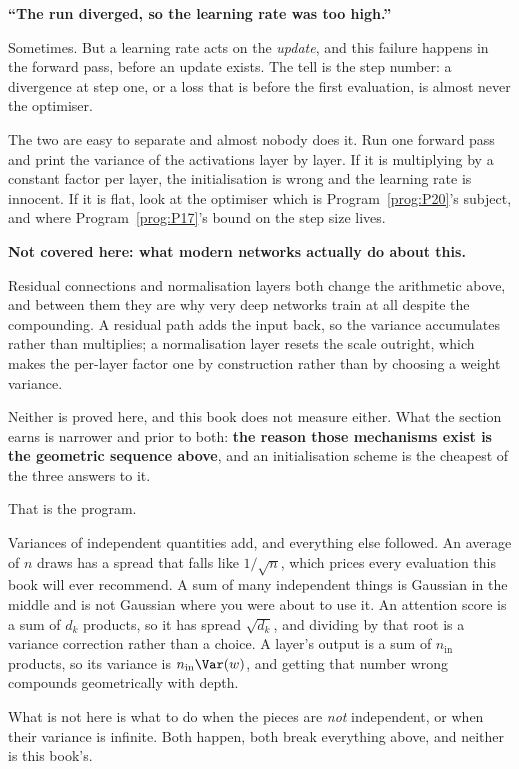 \begin{fr}
\begin{trapbox}
\textbf{\enquote{The run diverged, so the learning rate was too high.}}

Sometimes. But a learning rate acts on the \emph{update}, and this failure
happens in the forward pass, before an update exists. The tell is the step
number: a divergence at step one, or a loss that is  before the
first evaluation, is almost never the optimiser.

The two are easy to separate and almost nobody does it. Run one forward pass
and print the variance of the activations layer by layer. If it is
multiplying by a constant factor per layer, the initialisation is wrong and
the learning rate is innocent. If it is flat, look at the optimiser \dash{}
which is Program~\ref{prog:P20}'s subject, and where
Program~\ref{prog:P17}'s bound on the step size lives.
\end{trapbox}
\end{fr}

\begin{fr}
\begin{rigourbox}
\textbf{Not covered here: what modern networks actually do about this.}

Residual connections and normalisation layers both change the arithmetic
above, and between them they are why very deep networks train at all despite
the compounding. A residual path adds the input back, so the variance
accumulates rather than multiplies; a normalisation layer resets the scale
outright, which makes the per-layer factor one by construction rather than by
choosing a weight variance.

Neither is proved here, and this book does not measure either. What the
section earns is narrower and prior to both: \textbf{the reason those
mechanisms exist is the geometric sequence above}, and an initialisation
scheme is the cheapest of the three answers to it.
\end{rigourbox}
\end{fr}

\begin{fr}
That is the program.

Variances of independent quantities add, and everything else followed. An
average of $n$ draws has a spread that falls like $1/\sqrt{n}$, which prices
every evaluation this book will ever recommend. A sum of many independent
things is Gaussian in the middle and is not Gaussian where you were about to
use it. An attention score is a sum of $d_k$ products, so it has spread
$\sqrt{d_k}$, and dividing by that root is a variance correction rather than a
choice. A layer's output is a sum of $n_{\text{in}}$ products, so its variance
is $n_{\text{in}}\Var(w)$, and getting that number wrong compounds
geometrically with depth.


What is not here is what to do when the pieces are \emph{not} independent, or
when their variance is infinite. Both happen, both break everything above, and
neither is this book's.
\end{fr}

